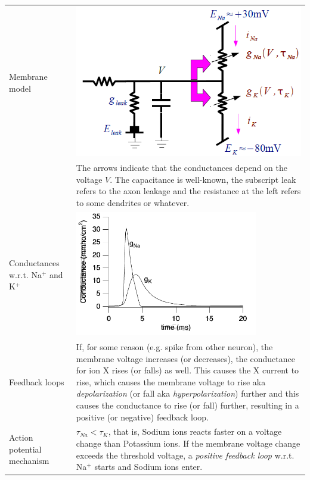 \begin{longtable}{p{4cm}p{15cm}}
Membrane model	& \includegraphics[width = 10cm]{neuroinf_membrane_as_circuit2.png}\\
		& The arrows indicate that the conductances depend on the voltage $V$. The capacitance is well-known, the subscript leak refers to the axon leakage and the resistance at the left refers to some dendrites or whatever.\\
Conductances w.r.t. Na$^+$ and K$^+$	& \includegraphics[width=8cm]{neuroinf_conductances.png}\\
Feedback loops	& If, for some reason (e.g. spike from other neuron), the membrane voltage increases (or decreases), the conductance for ion X rises (or falls) as well. This causes the X current to rise, which causes the membrane voltage to rise aka \textit{depolarization} (or fall aka \textit{hyperpolarization}) further and this causes the conductance to rise (or fall) further, resulting in a positive (or negative) feedback loop.\\
Action potential mechanism	& $\tau_{Na} < \tau_{K}$, that is, Sodium ions reacts faster on a voltage change than Potassium ions.\newline
		  If the membrane voltage change exceeds the threshold voltage, a \textit{positive feedback loop} w.r.t. Na$^+$ starts and Sodium ions enter.\newline

\end{longtable}
